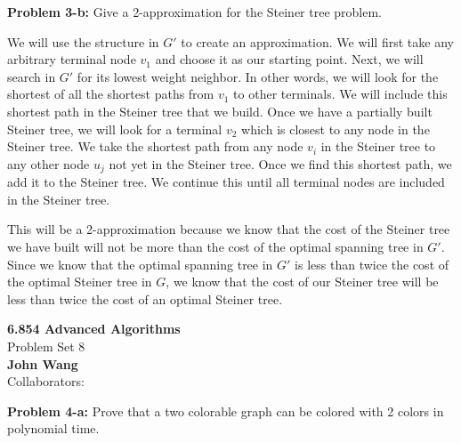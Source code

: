 \documentclass[psamsfonts]{amsart}
\newenvironment{sol}{\vspace{0.25cm}{\large \bfseries Solution:}}{\qedsymbol}
\newenvironment{prob}[1]{\begin{framed}{\large \bfseries Problem #1:}}{\end{framed}}
\newcommand{\makenewtitle}{
    \begin{center}
    {\huge \bfseries 6.854 Advanced Algorithms} \\
    Problem Set 8\\
    \vspace{0.25cm}
    {\bfseries John Wang} \\
    Collaborators:  
    \end{center}
    \vspace{0.5cm}
}
\begin{document}
\begin{prob}{3-b}
Give a 2-approximation for the Steiner tree problem.
\end{prob}
\begin{sol}
We will use the structure in $G'$ to create an approximation. We will first take any arbitrary terminal node $v_1$ and choose it as our starting point. Next, we will search in $G'$ for its lowest weight neighbor. In other words, we will look for the shortest of all the shortest paths from $v_1$ to other terminals. We will include this shortest path in the Steiner tree that we build. Once we have a partially built Steiner tree, we will look for a terminal $v_2$ which is closest to any node in the Steiner tree. We take the shortest path from any node $v_i$ in the Steiner tree to any other node $u_j$ not yet in the Steiner tree. Once we find this shortest path, we add it to the Steiner tree. We continue this until all terminal nodes are included in the Steiner tree.

This will be a 2-approximation because we know that the cost of the Steiner tree we have built will not be more than the cost of the optimal spanning tree in $G'$. Since we know that the optimal spanning tree in $G'$ is less than twice the cost of the optimal Steiner tree in $G$, we know that the cost of our Steiner tree will be less than twice the cost of an optimal Steiner tree.
\end{sol}

\newpage
\makenewtitle

\begin{prob}{4-a}
Prove that a two colorable graph can be colored with 2 colors in polynomial time.
\end{prob}
\end{document}
